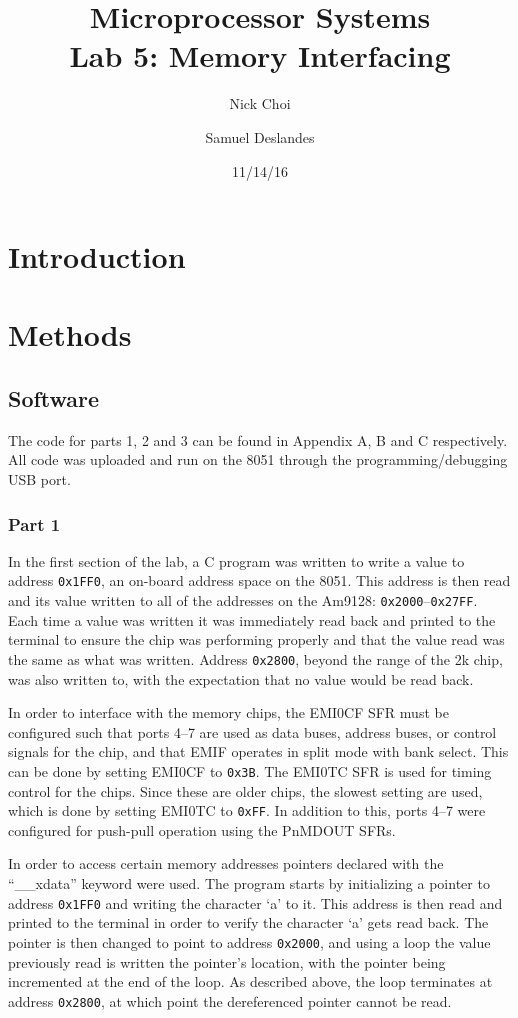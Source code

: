 \documentclass[12pt]{article}
\begin{document}
\title{Microprocessor Systems\\ Lab 5: Memory Interfacing }
\author{Nick Choi \and Samuel Deslandes}
\date{11/14/16}
\maketitle
\pagebreak
\section{Introduction}


\section{Methods}
\subsection{Software}
The code for parts 1, 2 and 3 can be found in Appendix A, B and C respectively. All code was uploaded and run on the 8051 through the programming/debugging USB port. 

\subsubsection{Part 1}
In the first section of the lab, a C program was written to write a value to address \texttt{0x1FF0}, an on-board address space on the 8051. This address is then read and its value written to all of the addresses on the Am9128: \texttt{0x2000}--\texttt{0x27FF}. Each time a value was written it was immediately read back and printed to the terminal to ensure the chip was performing properly and that the value read was the same as what was written. Address \texttt{0x2800}, beyond the range of the 2k chip, was also written to, with the expectation that no value would be read back.

In order to interface with the memory chips, the EMI0CF SFR must be configured such that ports 4--7 are used as data buses, address buses, or control signals for the chip, and that EMIF operates in split mode with bank select. This can be done by setting EMI0CF to \texttt{0x3B}. The EMI0TC SFR is used for timing control for the chips. Since these are older chips, the slowest setting are used, which is done by setting EMI0TC to \texttt{0xFF}. In addition to this, ports 4--7 were configured for push-pull operation using the PnMDOUT SFRs. 

In order to access certain memory addresses pointers declared with the ``\_\_xdata'' keyword were used. The program starts by initializing a pointer to address \texttt{0x1FF0} and writing the character `a' to it. This address is then read and printed to the terminal in order to verify the character `a' gets read back. The pointer is then changed to point to address \texttt{0x2000}, and using a loop the value previously read is written the pointer\textquoteright s location, with the pointer being incremented at the end of the loop. As described above, the loop terminates at address \texttt{0x2800}, at which point the dereferenced pointer cannot be read.
\end{document}
